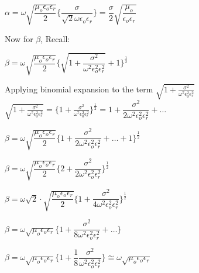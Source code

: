 \begin{center}
$\alpha = \omega\sqrt{\dfrac{\mu_{o}\epsilon_{o}\epsilon_{r}}{2}}\Bigg\{\dfrac{\sigma}{\sqrt{2}\omega\epsilon_{o}\epsilon_{r}}\Bigg\} =\dfrac{\sigma}{2}\sqrt{\dfrac{\mu_{o}}{\epsilon_{o}\epsilon_{r}}}$
\end{center}

Now for $\beta$, Recall:
\begin{center}
$\beta = \omega\sqrt{\dfrac{\mu_{o}\epsilon_{o}\epsilon_{r}}{2}}\Bigg\{{\sqrt{1 + \dfrac{\sigma^{2}}{\omega^{2}\epsilon_{o}^{2}\epsilon_{r}^{2}}}} + 1\Bigg\}^{\frac{1}{2}}$
\end{center}

Applying binomial expansion to the term $\sqrt{1 + \frac{\sigma^2}{\omega^2\epsilon_{0}^2\epsilon_{r}^2}}$\\

$\sqrt{1 + \frac{\sigma^2}{\omega^2\epsilon_{0}^2\epsilon_{r}^2}} = \bigg\{1 +\frac{\sigma^2}{\omega^2\epsilon_{0}^2\epsilon_{r}^2}\bigg\}^{\frac{1}{2}} = 1 + \dfrac{\sigma^{2}}{2\omega^{2}\epsilon_{o}^{2}\epsilon_{r}^{2}} + \dots$\\

\begin{center}
$\beta = \omega\sqrt{\dfrac{\mu_{o}\epsilon_{o}\epsilon_{r}}{2}}\Bigg\{1 + \dfrac{\sigma^{2}}{2\omega^{2}\epsilon_{o}^{2}\epsilon_{r}^{2}} + \dots + 1\Bigg\}^{\frac{1}{2}}$
\end{center}

\begin{center}
$\beta = \omega\sqrt{\dfrac{\mu_{o}\epsilon_{o}\epsilon_{r}}{2}}\Bigg\{2 + \dfrac{\sigma^{2}}{2\omega^{2}\epsilon_{o}^{2}\epsilon_{r}^{2}}\Bigg\}^{\frac{1}{2}}$
\end{center}

\begin{center}
$\beta = \omega\sqrt{2}\cdot\sqrt{\dfrac{\mu_{o}\epsilon_{o}\epsilon_{r}}{2}}\Bigg\{1 + \dfrac{\sigma^{2}}{4\omega^{2}\epsilon_{o}^{2}\epsilon_{r}^{2}}\Bigg\}^{\frac{1}{2}}$
\end{center}

\begin{center}
$\beta = \omega\sqrt{\mu_{o}\epsilon_{o}\epsilon_{r}}\Bigg\{1 + \dfrac{\sigma^{2}}{8\omega^{2}\epsilon_{o}^{2}\epsilon_{r}^{2}} + \dots\Bigg\}$
\end{center}


\begin{center}
$\beta = \omega\sqrt{\mu_{o}\epsilon_{o}\epsilon_{r}}\Bigg\{1 + \dfrac{1}{8} \dfrac{\sigma^{2}}{\omega^{2}\epsilon_{o}^{2}\epsilon_{r}^{2}}\Bigg\} \cong \omega\sqrt{\mu_{o}\epsilon_{o}\epsilon_{r}}$
\end{center}

